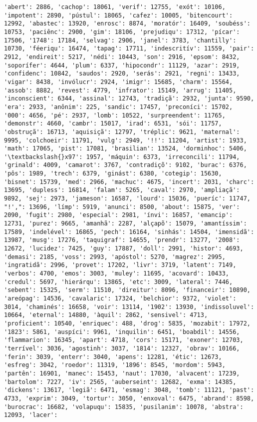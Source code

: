 \documentclass[11pt]{article}
\begin{document}
\begin{Verbatim}[commandchars=\\\{\}]
'abert': 2886, 'cachop': 18061, 'verif': 12755, 'exót': 10106, 'impotent': 2890, 'pústul': 18065, 'cafez': 10005, 'bitencourt': 12992, 'abastec': 13920, 'enrosc': 8874, 'moratór': 16409, 'soubéss': 10753, 'paciênc': 2900, 'gim': 18106, 'prejudiqu': 17312, 'pícar': 17506, '1748': 17184, 'selvag': 2906, 'janel': 3783, 'chantilly': 10730, 'féeriqu': 16474, 'tapag': 17711, 'indescritív': 11559, 'pair': 2912, 'endireit': 5217, 'nédi': 10443, 'son': 2916, 'epsom': 8432, 'soporífer': 4644, 'plum': 6337, 'hipocondr': 11129, 'azar': 2919, 'confidenc': 10842, 'saudos': 2920, 'serás': 2921, 'regni': 13433, 'vigar': 8438, 'invólucr': 2924, 'imigr': 15685, 'charm': 15564, 'assob': 8882, 'revest': 4779, 'infrator': 15149, 'arrug': 11405, 'inconscient': 6344, 'assinal': 12743, 'tradiçã': 2932, 'junta': 9590, 'era': 2933, 'anônim': 225, 'sandic': 17457, 'preconíci': 15702, '000': 4656, 'pé': 2937, 'lomb': 10522, 'surpreendent': 11765, 'demonstr': 4660, 'cambr': 15017, 'irad': 6531, 'sói': 11757, 'obstruçã': 16713, 'aquisiçã': 12797, 'tréplic': 9621, 'maternal': 9995, 'colchoeir': 11791, 'vulg': 2949, '!!': 11204, 'artist': 1933, 'math': 17065, 'pist': 17081, 'brasilian': 13524, 'dorminhoc': 5406, '\textbackslash{}x97': 1957, 'máquin': 6373, 'irreconcili': 11794, 'grinald': 4009, 'camarot': 3767, 'contradiçõ': 9102, 'burac': 6376, 'pôs': 1989, 'trech': 6379, 'ginást': 6380, 'cotegip': 15630, 'bisnet': 15739, 'med': 2966, 'machuc': 4675, 'incert': 2031, 'charc': 13695, 'dupless': 16814, 'falam': 5265, 'caval': 2970, 'ampliaçã': 9892, 'sej': 2973, 'jameson': 16587, 'lourd': 15036, 'pueríc': 11747, "!',": 13696, 'límp': 5919, 'anunci': 8500, 'about': 15875, 'ver': 2090, 'fugit': 2980, 'especial': 2981, 'ínvi': 16857, 'emancip': 12731, 'purez': 9665, 'amanhã': 2287, 'alçapõ': 15079, 'amantíssim': 17589, 'indelével': 16865, 'pech': 16164, 'sinhás': 14504, 'imensidã': 13987, 'musg': 17276, 'taquigraf': 14655, 'prendr': 13277, '2008': 12672, 'lucidez': 7425, 'guy': 17887, 'doll': 2991, 'histor': 4693, 'demasi': 2185, 'voss': 2993, 'apóstol': 5270, 'magrez': 2995, 'ingratidã': 2996, 'provet': 17202, 'livr': 3719, 'latent': 7149, 'verbos': 4700, 'emos': 3003, 'muley': 11695, 'acovard': 10433, 'credul': 5697, 'hierárqu': 13865, 'etc': 3009, 'lateral': 7446, 'sebent': 15325, 'serm': 11510, 'direitur': 8096, 'financeir': 10890, 'areópag': 14536, 'cavalaric': 17324, 'belchior': 9372, 'violet': 3014, 'chaminés': 16658, 'voir': 13114, '1902': 13930, 'indissoluvel': 10664, 'eternal': 14880, 'àquil': 2862, 'sensivel': 4713, 'proficient': 10540, 'enriquec': 488, 'drog': 5835, 'mozabit': 17972, '1823': 5861, 'auspíci': 9961, 'inquilin': 6451, 'boabdil': 14556, 'flammarion': 16345, 'apart': 4718, 'cors': 15171, 'exoner': 12703, 'terrível': 3036, 'agostinh': 3037, '1814': 12327, 'obrav': 10166, 'ferin': 3039, 'enterr': 3040, 'apens': 12281, 'étic': 12673, 'esfreg': 3042, 'roedor': 11319, '1896': 8545, 'mordom': 5943, 'partên': 16901, 'manec': 15453, 'naut': 17030, 'alvacent': 17239, 'bartolom': 7227, 'iv': 2565, 'auberseint': 12682, 'exma': 14385, 'dickens': 13617, 'legiã': 6471, 'esmag': 3048, 'tomb': 11121, 'past': 4733, 'exprim': 3049, 'tortur': 3050, 'enxoval': 6475, 'abrand': 8598, 'burocrac': 16682, 'volapuqu': 15835, 'pusilanim': 10078, 'abstra': 12093, 'lacer': 
\end{Verbatim}
\end{document}
